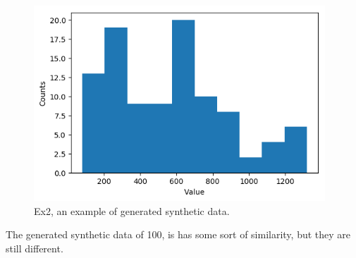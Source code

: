 \documentclass{article}
\begin{document}
\begin{figure}[!hbt]
	\centering
	\includegraphics[width=4.3in]{ex2_synt2}
	\caption{Ex2, an example of generated synthetic data.}
	\label{fig:ex2_synt2}
\end{figure}

The generated synthetic data of 100, is has some sort of similarity, but they are still different.
\end{document}
